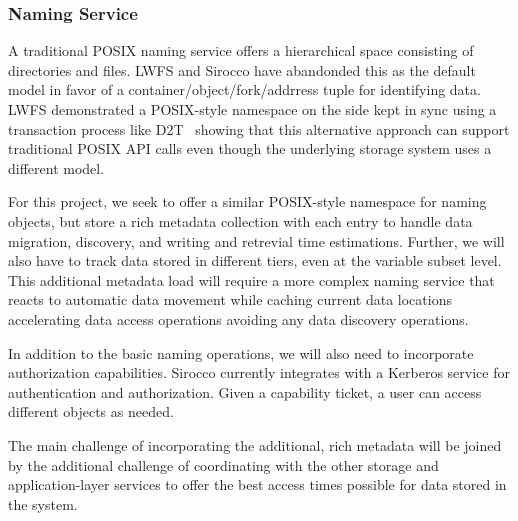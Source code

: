 \subsubsection{Naming Service}

A traditional POSIX naming service offers a hierarchical space consisting of
directories and files. LWFS and Sirocco have abandonded this as the default
model in favor of a container/object/fork/addrress tuple for identifying data.
LWFS demonstrated a POSIX-style namespace on the side kept in sync using a
transaction process like D2T~\cite{d2t} showing that this alternative approach
can support traditional POSIX API calls even though the underlying storage
system uses a different model.

For this project, we seek to offer a similar POSIX-style namespace for naming
objects, but store a rich metadata collection with each entry to handle data
migration, discovery, and writing and retrevial time estimations. Further, we
will also have to track data stored in different tiers, even at the variable
subset level. This additional metadata load will require a more complex naming
service that reacts to automatic data movement while caching current data
locations accelerating data access operations avoiding any data discovery
operations.

In addition to the basic naming operations, we will also need to incorporate
authorization capabilities. Sirocco currently integrates with a Kerberos
service for authentication and authorization. Given a capability ticket, a
user can access different objects as needed.

The main challenge of incorporating the additional, rich metadata will be
joined by the additional challenge of coordinating with the other storage
and application-layer services to offer the best access times possible for data
stored in the system.
